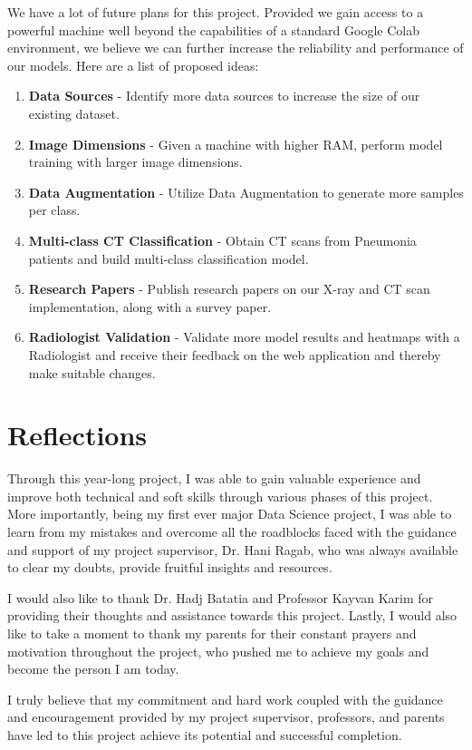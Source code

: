 We have a lot of future plans for this project. Provided we gain access to a powerful machine well beyond the capabilities of a standard Google Colab environment, we believe we can further increase the reliability and performance of our models. Here are a list of proposed ideas:
\begin{enumerate}
    \item \textbf{Data Sources} - Identify more data sources to increase the size of our existing dataset.
    \item \textbf{Image Dimensions} - Given a machine with higher RAM, perform model training with larger image dimensions.
    \item \textbf{Data Augmentation} - Utilize Data Augmentation to generate more samples per class.
    \item \textbf{Multi-class CT Classification} - Obtain CT scans from Pneumonia patients and build multi-class classification model.
    \item \textbf{Research Papers} - Publish research papers on our X-ray and CT scan implementation, along with a survey paper.
    \item \textbf{Radiologist Validation} - Validate more model results and heatmaps with a Radiologist and receive their feedback on the web application and thereby make suitable changes.
\end{enumerate}
\section{Reflections}

Through this year-long project, I was able to gain valuable experience and improve both technical and soft skills through various phases of this project. More importantly, being my first ever major Data Science project, I was able to learn from my mistakes and overcome all the roadblocks faced with the guidance and support of my project supervisor, Dr. Hani Ragab, who was always available to clear my doubts, provide fruitful insights and resources. 

I would also like to thank Dr. Hadj Batatia and Professor Kayvan Karim for providing their thoughts and assistance towards this project. Lastly, I would also like to take a moment to thank my parents for their constant prayers and motivation throughout the project, who pushed me to achieve my goals and become the person I am today. 

I truly believe that my commitment and hard work coupled with the guidance and encouragement provided by my project supervisor, professors, and parents have led to this project achieve its potential and successful completion.